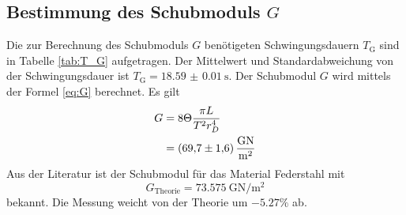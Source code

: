 \subsection{Bestimmung des Schubmoduls \texorpdfstring{$G$}{G}}

Die zur Berechnung des Schubmoduls $G$ benötigeten Schwingungsdauern $T_\text{G}$ sind in Tabelle \ref{tab:T_G} aufgetragen.
Der Mittelwert und Standardabweichung von der Schwingungsdauer ist $T_\text{G}=\SI{18.59(1)}{\second}$.
Der Schubmodul $G$ wird mittels der Formel \eqref{eq:G} berechnet.
Es gilt
\begin{align}
	G 	&=  8 \Theta\frac{\pi L}{T^2 r_D^4}\\%
		&=	\SI{69.7\pm1.6}{\giga\newton\per\meter\squared}
	\label{eq:schubmodul}
	\end{align}
Aus der Literatur ist der Schubmodul für das Material Federstahl mit
\begin{equation}
	G_\text{Theorie} = \SI{73.575}{\giga\newton\per\meter\squared}
\end{equation}bekannt.
Die Messung weicht von der Theorie um $-5.27\%$ ab.
